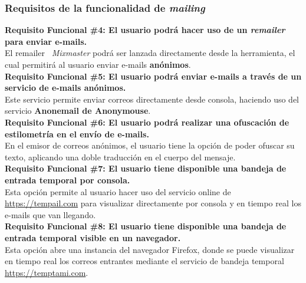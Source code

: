 \subsubsection{Requisitos de la funcionalidad de \textit{mailing}}
\begin{adjustwidth}{0.5cm}{}
	\textbf{Requisito Funcional \#4: El usuario podrá hacer uso de un \textit{remailer} para enviar e-mails.}\\
	El remailer~\cite{article:remailer} \textit{Mixmaster} podrá ser lanzada directamente desde la herramienta, el cual permitirá al usuario enviar e-mails \textbf{anónimos}.\\
	\linebreak
	\textbf{Requisito Funcional \#5: El usuario podrá enviar e-mails a través de un servicio de e-mails anónimos.}\\
	Este servicio permite enviar correos directamente desde consola, haciendo uso del servicio \textbf{Anonemail de Anonymouse}. \\
	\linebreak
	\textbf{Requisito Funcional \#6: El usuario podrá realizar una ofuscación de estilometría en el envío de e-mails.}\\
	En el emisor de correos anónimos, el usuario tiene la opción de poder ofuscar su texto, aplicando una doble traducción en el cuerpo del mensaje.\\
	\linebreak
	\textbf{Requisito Funcional \#7: El usuario tiene disponible una bandeja de entrada temporal por consola.}\\
	Esta opción permite al usuario hacer uso del servicio online de \url{https://tempail.com} para visualizar directamente por consola y en tiempo real los e-mails que van llegando.\\
	\linebreak	
	\textbf{Requisito Funcional \#8: El usuario tiene disponible una bandeja de entrada temporal visible en un navegador.}\\
	Esta opción abre una instancia del navegador Firefox, donde se puede visualizar en tiempo real los correos entrantes mediante el servicio de bandeja temporal \url{https://temptami.com}.\\	
\end{adjustwidth}
